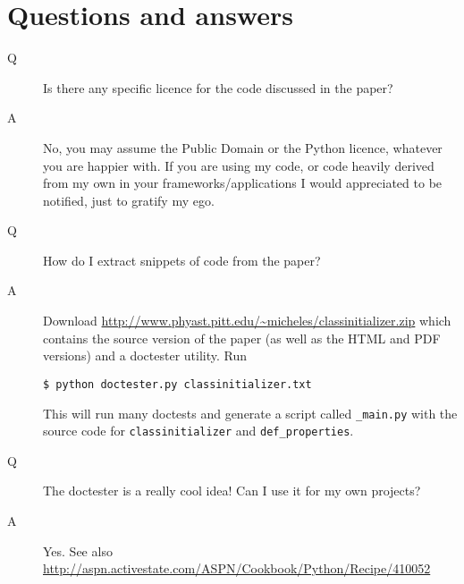 \documentclass[10pt,a4paper,english]{article}
\begin{document}
\section*{Questions and answers}
\begin{description}
\item[{Q}] %

Is there any specific licence for the code discussed in the paper?

\item[{A}] %

No, you may assume the Public Domain or the Python licence, whatever
you are happier with. If you are using my code, or
code heavily derived from my own in your frameworks/applications I
would appreciated to be notified, just to gratify my ego.

\item[{Q}] %

How do I extract snippets of code from the paper?

\item[{A}] %

Download \href{http://www.phyast.pitt.edu/~micheles/classinitializer.zip}{http://www.phyast.pitt.edu/{\textasciitilde}micheles/classinitializer.zip}
which contains the source
version of the paper (as well as the HTML and PDF versions)
and a doctester utility. Run

\texttt{{\$} python doctester.py classinitializer.txt}

This will run many doctests and generate a script called \texttt{{\_}main.py}
with the source code for \texttt{classinitializer} and \texttt{def{\_}properties}.

\item[{Q}] %

The doctester is a really cool idea! Can I use it for my own projects?

\item[{A}] %

Yes. See also
\href{http://aspn.activestate.com/ASPN/Cookbook/Python/Recipe/410052}{http://aspn.activestate.com/ASPN/Cookbook/Python/Recipe/410052}

\end{description}
\end{document}
